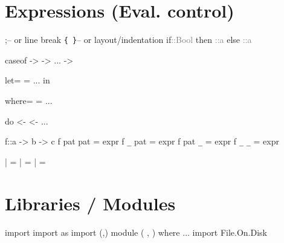 \documentclass{refcard}
\begin{document}
\vspace{20mm} %


\section{Expressions (Eval. control)}

\begin{ldesc}
	         ;\s\s\s\s-- or line break
	          \verb+{ }+\s\s-- or layout/indentation
	\li
	\li[if expression]
		if\s{}\s\textcolor{gray}{::\s{}Bool} \li
		\s\s{}then\s{} \textcolor{gray}{::\s{}a} \li
		\s\s{}else\s{} \textcolor{gray}{::\s{}a} \li

		case\s{}\s{}of     \li
		\s\s{}\s->\s{}   \li
		\s\s{}\s->\s{}   \li
		\s\s... \li
		\s\s{}\I{\_}\s->\s{}   \li

		let\s{}= \li
		\s\s\s\s{}= \li
		\s\s\s\s... \li
		in\s{} \li

		 \li
		where\s{}= \li
		\s\s\s\s\s\s{}= \li
		\s\s\s\s\s\s... \li

	\li[do notation]
		do       \li
		\s\s\s{} <-  \li
		\s\s\s{} \li
		\s\s\s{} <-  \li
		\s\s\s{}... \li

		f\s::\s{}a -> b -> c 
		f pat pat = expr \li
		f \verb+_+\s\s{} pat = expr \li
		f pat \verb+_+\s\s{} = expr \li
		f \verb+_+\s\s{} \verb+_+\s\s{} = expr \li
	
		 \li
		\s\s|  =  \li
		\s\s|  =  \li
		\s\s|  = 
\end{ldesc}


\section{Libraries / Modules}

\begin{ldesc}
	\li[importing]              import 
	  import  as 
	     import  (,)
	\li[declaring]
		module  \li
		\s\s(  \li
		\s\s,  \li
		\s\s) \li
		where \li
	    ... \li
	 import File.On.Disk
\end{ldesc}
\end{document}
